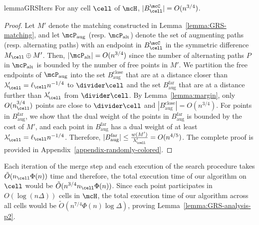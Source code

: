 \begin{restatable}{lemma}{GRSIters}\label{lemma:GRS-cell-process}
    For any cell $\cell$ of $\mcH$, $|B_\cell^\mcC|=O(n^{3/4})$.
\end{restatable}
\begin{proof}
    Let $M'$ denote the matching constructed in Lemma~\ref{lemma:GRS-matching}, and let $\mcP_{\mathrm{aug}}$ (resp. $\mcP_{\mathrm{alt}}$) denote the set of augmenting paths (resp. alternating paths) with an endpoint in $B_\cell^\mcC$ in the symmetric difference $M_\cell\oplus M'$. Then, $|\mcP_{\mathrm{alt}}|=O(n^{3/4})$ since the number of alternating paths $P$ in $\mcP_{\mathrm{alt}}$ is bounded by the number of free points in $M'$. 
    We partition the free endpoints of $\mcP_{\mathrm{aug}}$ into the set $B^{\mathrm{close}}_{\mathrm{aug}}$ that are at a distance closer than $\lambda'_\cell=\ell_\cell n^{-1/4}$ to $\divider\cell$ and the set $B^{\mathrm{far}}_{\mathrm{aug}}$ that are at a distance further than $\lambda'_\cell$ from $\divider\cell$. By Lemma~\ref{lemma:margin}, only $O(n_\cell^{3/4})$ points are close to $\divider\cell$ and $|B^{\mathrm{close}}_{\mathrm{aug}}|=O(n^{3/4})$. 
    For points in $B^{\mathrm{far}}_{\mathrm{aug}}$, we show that the dual weight of the points in $B^{\mathrm{far}}_{\mathrm{aug}}$ is bounded by the cost of $M'$, and each point in $B^{\mathrm{far}}_{\mathrm{aug}}$ has a dual weight of at least $\lambda'_\cell = \ell_\cell n^{-1/4}$. Therefore, $|B^{\mathrm{far}}_{\mathrm{aug}}|\le \frac{w(M')}{\lambda'_\cell}= O(n^{4/5})$. The complete proof is provided in Appendix~\ref{appendix-randomly-colored}.
\end{proof}



Each iteration of the merge step and each execution of the search procedure takes $\tilde{O}(n_\cell\Phi(n))$ time and therefore, the total execution time of our algorithm on $\cell$ would be $\tilde{O}(n^{3/4}n_\cell\Phi(n))$. Since each point participates in $O(\log(n\Delta))$ cells in $\mcH$, the total execution time of our algorithm across all cells would be $\tilde{O}(n^{7/4}\Phi(n)\log\Delta)$, proving Lemma~\ref{lemma:GRS-analysis-p2}.
















